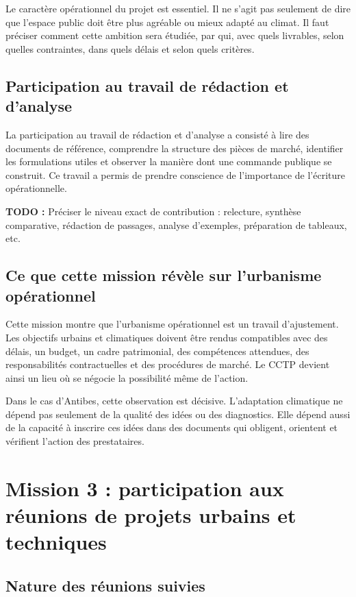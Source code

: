 \documentclass[11pt,a4paper]{report}
\newcommand{\todo}[1]{\textcolor{todored}{\textbf{TODO :} #1}}
\begin{document}
Le caractère opérationnel du projet est essentiel. Il ne s'agit pas seulement de dire que l'espace public doit être plus agréable ou mieux adapté au climat. Il faut préciser comment cette ambition sera étudiée, par qui, avec quels livrables, selon quelles contraintes, dans quels délais et selon quels critères.

\subsection{Participation au travail de rédaction et d'analyse}

La participation au travail de rédaction et d'analyse a consisté à lire des documents de référence, comprendre la structure des pièces de marché, identifier les formulations utiles et observer la manière dont une commande publique se construit. Ce travail a permis de prendre conscience de l'importance de l'écriture opérationnelle.

\todo{Préciser le niveau exact de contribution : relecture, synthèse comparative, rédaction de passages, analyse d'exemples, préparation de tableaux, etc.}

\subsection{Ce que cette mission révèle sur l'urbanisme opérationnel}

Cette mission montre que l'urbanisme opérationnel est un travail d'ajustement. Les objectifs urbains et climatiques doivent être rendus compatibles avec des délais, un budget, un cadre patrimonial, des compétences attendues, des responsabilités contractuelles et des procédures de marché. Le CCTP devient ainsi un lieu où se négocie la possibilité même de l'action.

Dans le cas d'Antibes, cette observation est décisive. L'adaptation climatique ne dépend pas seulement de la qualité des idées ou des diagnostics. Elle dépend aussi de la capacité à inscrire ces idées dans des documents qui obligent, orientent et vérifient l'action des prestataires.

\section{Mission 3 : participation aux réunions de projets urbains et techniques}

\subsection{Nature des réunions suivies}
\end{document}

